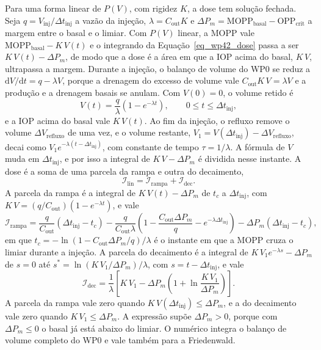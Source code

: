 Para uma forma linear de $P(V)$, com rigidez $K$, a dose tem solução fechada. Seja $q=V_{\text{inj}}/\Delta t_{\text{inj}}$ a vazão da injeção, $\lambda=C_{\text{out}}K$ e $\Delta P_{m}=\mathrm{MOPP}_{\text{basal}}-\mathrm{OPP}_{\text{crit}}$ a margem entre o basal e o limiar. Com $P(V)$ linear, a MOPP vale $\mathrm{MOPP}_{\text{basal}}-K\,V(t)$ e o integrando da Equação~\ref{eq_wp42_dose} passa a ser $K\,V(t)-\Delta P_{m}$, de modo que a dose é a área em que a IOP acima do basal, $K\,V$, ultrapassa a margem. Durante a injeção, o balanço de volume do WP0 se reduz a $\mathrm{d}V/\mathrm{d}t=q-\lambda V$, porque a drenagem do excesso de volume vale $C_{\text{out}}K\,V=\lambda V$ e a produção e a drenagem basais se anulam. Com $V(0)=0$, o volume retido é
\begin{equation}
V(t)=\frac{q}{\lambda}\left(1-e^{-\lambda t}\right),\qquad 0\le t\le\Delta t_{\text{inj}},
\label{eq_wp42_vrampa}
\end{equation}
e a IOP acima do basal vale $K\,V(t)$. Ao fim da injeção, o refluxo remove o volume $\Delta V_{\text{refluxo}}$ de uma vez, e o volume restante, $V_1=V(\Delta t_{\text{inj}})-\Delta V_{\text{refluxo}}$, decai como $V_1e^{-\lambda(t-\Delta t_{\text{inj}})}$, com constante de tempo $\tau=1/\lambda$. A fórmula de $V$ muda em $\Delta t_{\text{inj}}$, e por isso a integral de $K\,V-\Delta P_{m}$ é dividida nesse instante. A dose é a soma de uma parcela da rampa e outra do decaimento,
\begin{equation}
\mathcal{I}_{\text{lin}}=\mathcal{I}_{\text{rampa}}+\mathcal{I}_{\text{dec}}.
\label{eq_wp42_fechada}
\end{equation}
A parcela da rampa é a integral de $K\,V(t)-\Delta P_{m}$ de $t_c$ a $\Delta t_{\text{inj}}$, com $K\,V=(q/C_{\text{out}})(1-e^{-\lambda t})$, e vale
\begin{equation}
\mathcal{I}_{\text{rampa}}=\frac{q}{C_{\text{out}}}\left(\Delta t_{\text{inj}}-t_c\right)-\frac{q}{C_{\text{out}}\lambda}\left(1-\frac{C_{\text{out}}\Delta P_{m}}{q}-e^{-\lambda\Delta t_{\text{inj}}}\right)-\Delta P_{m}\left(\Delta t_{\text{inj}}-t_c\right),
\label{eq_wp42_rampa}
\end{equation}
em que $t_c=-\ln\!\left(1-C_{\text{out}}\Delta P_{m}/q\right)/\lambda$ é o instante em que a MOPP cruza o limiar durante a injeção. A parcela do decaimento é a integral de $K\,V_1e^{-\lambda s}-\Delta P_{m}$ de $s=0$ até $s^{*}=\ln(K\,V_1/\Delta P_{m})/\lambda$, com $s=t-\Delta t_{\text{inj}}$, e vale
\begin{equation}
\mathcal{I}_{\text{dec}}=\frac{1}{\lambda}\left[K\,V_1-\Delta P_{m}\left(1+\ln\frac{K\,V_1}{\Delta P_{m}}\right)\right].
\label{eq_wp42_dec}
\end{equation}
A parcela da rampa vale zero quando $K\,V(\Delta t_{\text{inj}})\le\Delta P_{m}$, e a do decaimento vale zero quando $K\,V_1\le\Delta P_{m}$. A expressão supõe $\Delta P_{m}>0$, porque com $\Delta P_{m}\le0$ o basal já está abaixo do limiar. O numérico integra o balanço de volume completo do WP0 e vale também para a Friedenwald.

